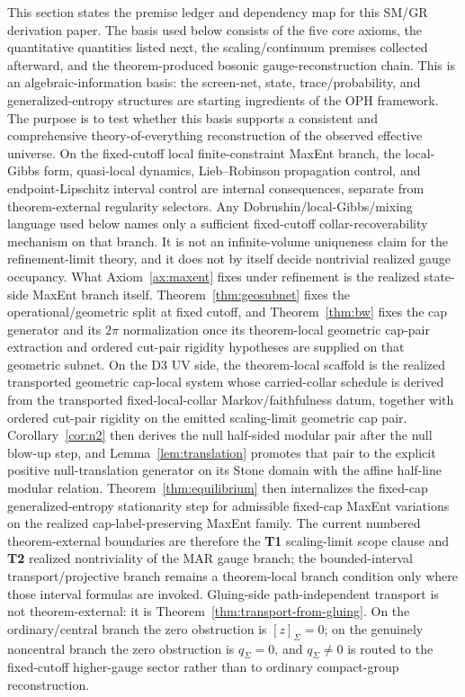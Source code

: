 \documentclass[11pt]{article}
\begin{document}
This section states the premise ledger and dependency map for this SM/GR derivation paper. The basis used below consists of the five core axioms, the quantitative quantities listed next, the scaling/continuum premises collected afterward, and the theorem-produced bosonic gauge-reconstruction chain. This is an algebraic-information basis: the screen-net, state, trace/probability, and generalized-entropy structures are starting ingredients of the OPH framework. The purpose is to test whether this basis supports a consistent and comprehensive theory-of-everything reconstruction of the observed effective universe. On the fixed-cutoff local finite-constraint MaxEnt branch, the local-Gibbs form, quasi-local dynamics, Lieb--Robinson propagation control, and endpoint-Lipschitz interval control are internal consequences, separate from theorem-external regularity selectors. Any Dobrushin/local-Gibbs/mixing language used below names only a sufficient fixed-cutoff collar-recoverability mechanism on that branch. It is not an infinite-volume uniqueness claim for the refinement-limit theory, and it does not by itself decide nontrivial realized gauge occupancy. What Axiom~\ref{ax:maxent} fixes under refinement is the realized state-side MaxEnt branch itself. Theorem~\ref{thm:geosubnet} fixes the operational/geometric split at fixed cutoff, and Theorem~\ref{thm:bw} fixes the cap generator and its \(2\pi\) normalization once its theorem-local geometric cap-pair extraction and ordered cut-pair rigidity hypotheses are supplied on that geometric subnet. On the D3 UV side, the theorem-local scaffold is the realized transported geometric cap-local system whose carried-collar schedule is derived from the transported fixed-local-collar Markov/faithfulness datum, together with ordered cut-pair rigidity on the emitted scaling-limit geometric cap pair. Corollary~\ref{cor:n2} then derives the null half-sided modular pair after the null blow-up step, and Lemma~\ref{lem:translation} promotes that pair to the explicit positive null-translation generator on its Stone domain with the affine half-line modular relation. Theorem~\ref{thm:equilibrium} then internalizes the fixed-cap generalized-entropy stationarity step for admissible fixed-cap MaxEnt variations on the realized cap-label-preserving MaxEnt family. The current numbered theorem-external boundaries are therefore the \textbf{T1} scaling-limit scope clause and \textbf{T2} realized nontriviality of the MAR gauge branch; the bounded-interval transport/projective branch remains a theorem-local branch condition only where those interval formulas are invoked. Gluing-side path-independent transport is not theorem-external: it is Theorem~\ref{thm:transport-from-gluing}. On the ordinary/central branch the zero obstruction is \([z]_\Sigma=0\); on the genuinely noncentral branch the zero obstruction is \(q_\Sigma=0\), and \(q_\Sigma\ne0\) is routed to the fixed-cutoff higher-gauge sector rather than to ordinary compact-group reconstruction.
\end{document}
